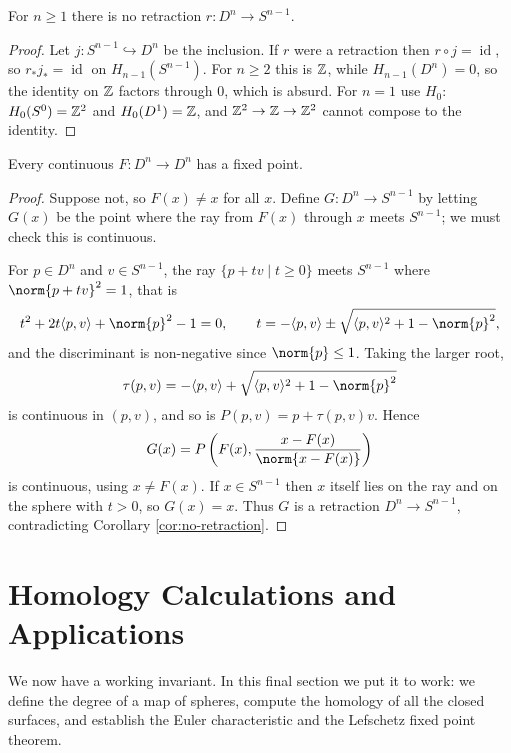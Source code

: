 \documentclass[a4paper]{scrartcl}
\newcommand{\id}{\operatorname{id}}
\begin{document}
\begin{corollary} \label{cor:no-retraction}
	For $n \geq 1$ there is no retraction $r: D^n \to S^{n-1}$.
\end{corollary}
\begin{proof}
	Let $j: S^{n-1}\hookrightarrow D^n$ be the inclusion. If $r$ were a retraction then $r\circ j = \id$, so $r_*j_* = \id$ on $H_{n-1}(S^{n-1})$. For $n \geq 2$ this is $\mathbb{Z}$, while $H_{n-1}(D^n) = 0$, so the identity on $\mathbb{Z}$ factors through $0$, which is absurd. For $n = 1$ use $H_0$: $H_0(S^0) = \mathbb{Z}^2$ and $H_0(D^1) = \mathbb{Z}$, and $\mathbb{Z}^2 \to \mathbb{Z} \to \mathbb{Z}^2$ cannot compose to the identity.
\end{proof}

\begin{theorem} \label{thm:brouwer}
	Every continuous $F: D^n \to D^n$ has a fixed point.
\end{theorem}
\begin{proof}
	Suppose not, so $F(x)\neq x$ for all $x$. Define $G: D^n \to S^{n-1}$ by letting $G(x)$ be the point where the ray from $F(x)$ through $x$ meets $S^{n-1}$; we must check this is continuous.

	For $p \in D^n$ and $v\in S^{n-1}$, the ray $\{p+tv \mid t \geq 0\}$ meets $S^{n-1}$ where $\norm{p+tv}^2 = 1$, that is
	$$
	t^2 + 2t\langle p,v\rangle + \norm{p}^2 - 1 = 0, \qquad t = -\langle p,v\rangle \pm \sqrt{\langle p,v\rangle^2+1-\norm{p}^2},
	$$
	and the discriminant is non-negative since $\norm{p}\leq 1$. Taking the larger root,
	$$
	\tau(p,v) = -\langle p,v\rangle + \sqrt{\langle p,v\rangle^2+1-\norm{p}^2}
	$$
	is continuous in $(p,v)$, and so is $P(p,v) = p + \tau(p,v)v$. Hence
	$$
	G(x) = P\left(F(x), \frac{x-F(x)}{\norm{x-F(x)}}\right)
	$$
	is continuous, using $x \neq F(x)$. If $x \in S^{n-1}$ then $x$ itself lies on the ray and on the sphere with $t > 0$, so $G(x) = x$. Thus $G$ is a retraction $D^n \to S^{n-1}$, contradicting Corollary \ref{cor:no-retraction}.
\end{proof}

\section{Homology Calculations and Applications}

We now have a working invariant. In this final section we put it to work: we define the
degree of a map of spheres, compute the homology of all the closed surfaces, and
establish the Euler characteristic and the Lefschetz fixed point theorem.
\end{document}
